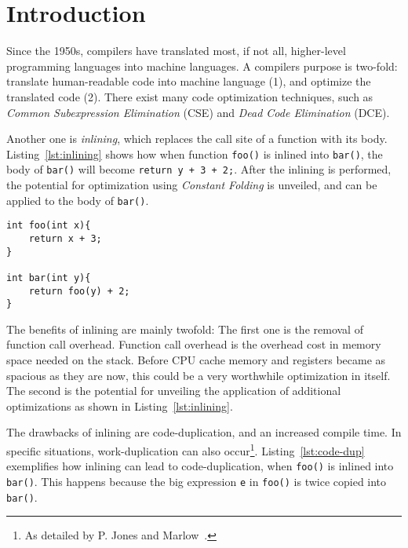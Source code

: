 
\section{Introduction}
\label{introduction}

Since the 1950s, compilers have translated most, if not all, higher-level
programming languages into machine languages. A compilers purpose is two-fold:
translate human-readable code into machine language (1), and optimize the
translated code (2). There exist many code optimization techniques, such as
\textit{Common Subexpression Elimination} (CSE) and \textit{Dead Code
Elimination} (DCE).

Another one is \textit{inlining}, which replaces the call site of a function
with its body. Listing~\ref{lst:inlining} shows how when function
\lstinline!foo()! is inlined into \lstinline!bar()!, the body of
\lstinline!bar()! will become \lstinline!return y + 3 + 2;!. After the inlining
is performed, the potential for optimization using \textit{Constant Folding}
is unveiled, and can be applied to the body of \lstinline!bar()!.

\begin{lstlisting}[label={lst:inlining}, style=global_customcpp,
caption={Function \lstinline!foo()! inlined into function \lstinline!bar()!.}]
int foo(int x){
	return x + 3;
}

int bar(int y){
	return foo(y) + 2;
}
\end{lstlisting}
\vspace{-4\parskip} %

The benefits of inlining are mainly twofold: The first one is the removal of
function call overhead. Function call overhead is the overhead cost in memory
space needed on the stack. Before CPU cache memory and registers became as
spacious as they are now, this could be a very worthwhile optimization in
itself. The second is the potential for unveiling the application of additional
optimizations as shown in Listing~\ref{lst:inlining}.

The drawbacks of inlining are code-duplication, and an increased compile time.
In specific situations, work-duplication can also occur\footnote{As detailed by
P. Jones and Marlow~\cite{GHCPaper}.}. Listing~\ref{lst:code-dup} exemplifies
how inlining can lead to code-duplication, when \lstinline!foo()! is inlined
into \lstinline!bar()!. This happens because the big expression \lstinline!e! in
\lstinline!foo()! is twice copied into \lstinline!bar()!.

